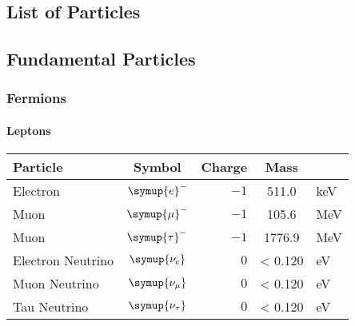 \documentclass[fleqn]{NotesClass}
\newcommand{\Pparticle}[1]{\symup{#1}}
\newcommand{\Pe}{\ensuremath{\Pparticle{e}^{-}}}
\newcommand{\Pmu}{\ensuremath{\Pparticle{\mu}^{-}}}
\newcommand{\Ptau}{\ensuremath{\Pparticle{\tau}^{-}}}
\newcommand{\Pnue}{\ensuremath{\Pparticle{\nu_{e}}}}
\newcommand{\Pnumu}{\ensuremath{\Pparticle{\nu_{\mu}}}}
\newcommand{\Pnutau}{\ensuremath{\Pparticle{\nu_{\tau}}}}
\begin{document}
    \appendixpage
    \begin{appendices}
        \chapter{List of Particles}
        \section{Fundamental Particles}
        \subsection{Fermions}
        \subsubsection{Leptons}
        \begin{center}
            \begin{tabular}{lcrSl}\toprule
                Particle & Symbol & Charge & Mass & \\ \hline
                Electron & \Pe & \(-1\) & 511.0 & \si{\kilo\electronvolt} \\
                Muon & \Pmu & \(-1\) & 105.6 & \si{\mega\electronvolt} \\
                Muon & \Ptau & \(-1\) & 1776.9 & \si{\mega\electronvolt} \\
                Electron Neutrino & \Pnue & \(0\) & < 0.120 & \si{\electronvolt} \\
                Muon Neutrino & \Pnumu & \(0\) & < 0.120 & \si{\electronvolt} \\
                Tau Neutrino & \Pnutau & \(0\) & < 0.120 & \si{\electronvolt} \\
                \bottomrule
            \end{tabular}
        \end{center}
    

\end{appendices}
\end{document}
